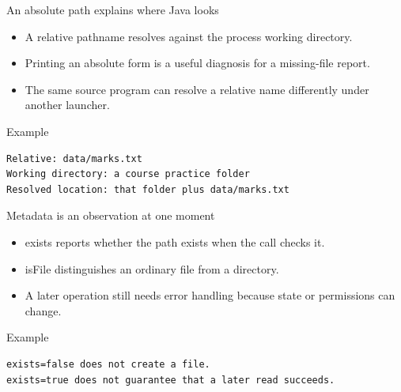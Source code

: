 \documentclass[10pt,aspectratio=169]{beamer}
\begin{document}
\begin{frame}[fragile,t]{An absolute path explains where Java looks}
\begin{itemize}
\item A relative pathname resolves against the process working directory.
\item Printing an absolute form is a useful diagnosis for a missing-file report.
\item The same source program can resolve a relative name differently under another launcher.
\end{itemize}
\vspace{1mm}\begin{block}{Example}
\begin{lstlisting}
Relative: data/marks.txt
Working directory: a course practice folder
Resolved location: that folder plus data/marks.txt
\end{lstlisting}
\end{block}
\end{frame}

\begin{frame}[fragile,t]{Metadata is an observation at one moment}
\begin{itemize}
\item exists reports whether the path exists when the call checks it.
\item isFile distinguishes an ordinary file from a directory.
\item A later operation still needs error handling because state or permissions can change.
\end{itemize}
\vspace{1mm}\begin{block}{Example}
\begin{lstlisting}
exists=false does not create a file.
exists=true does not guarantee that a later read succeeds.
\end{lstlisting}
\end{block}
\end{frame}
\end{document}
